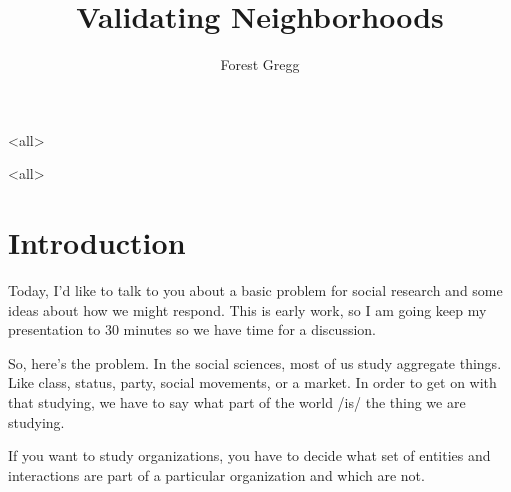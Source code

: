 
\usepackage[english]{babel}
\usepackage{tikz}
\usepackage{xmpmulti}
\newcommand{\fadeitem}[2]{\item[]\uncover<#1>{#2}}
\title{Validating Neighborhoods}
\author{Forest Gregg}

\mode*
\maketitle



\mode<all>{
}

\mode<all>{
\blackout{}
}  



\section{Introduction}
Today, I'd like to talk to you about a basic problem for social
research and some ideas about how we might respond. This is early
work, so I am going keep my presentation to 30 minutes so we have time
for a discussion.

So, here's the problem. In the social sciences, most of us study
aggregate things. Like class, status, party, social movements, or a
market. In order to get on with that studying, we have to say what
part of the world /is/ the thing we are studying.

If you want to study organizations, you have to decide what set of
entities and interactions are part of a particular organization and
which are not.


